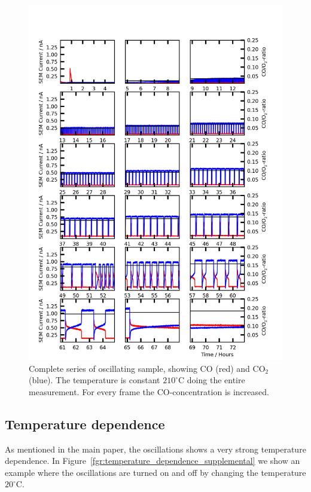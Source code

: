 \documentclass[8.5pt,twoside,twocolumn]{article}
\begin{document}
\begin{figure}
  \centering
  \includegraphics[width=14cm]{oscillations_gas_dependence_supplemental.png}
  \caption{Complete series of oscillating sample, showing CO (red) and CO$_2$ (blue). The temperature is constant $210^\circ$C doing the entire measurement. For every frame the CO-concentration is increased.}
  \label{fgr:gas_dependence}
\end{figure}

\subsection{Temperature dependence}
As mentioned in the main paper, the oscillations shows a very strong temperature dependence. In Figure~\ref{fgr:temperature_dependence_supplemental} we show an example where the oscillations are turned on and off by changing the temperature $20^\circ$C.
\end{document}
